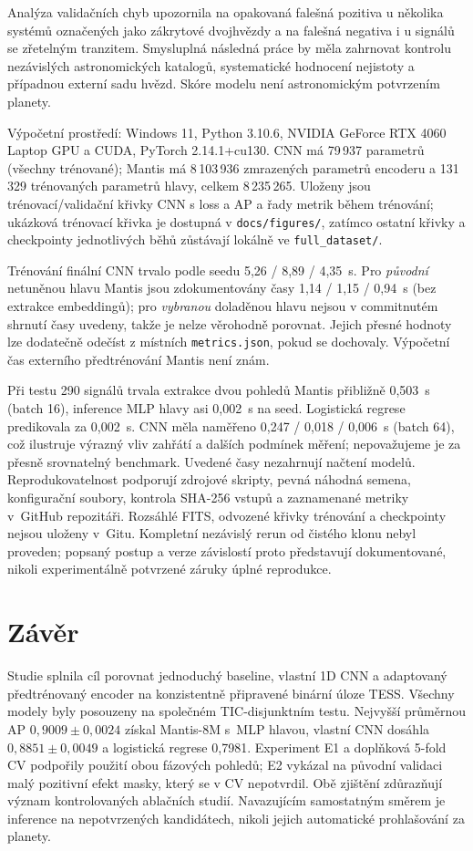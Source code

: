 \documentclass[11pt,a4paper]{article}
\newcommand{\code}[1]{\texttt{#1}}
\begin{document}
Analýza validačních chyb upozornila na opakovaná falešná pozitiva u několika systémů označených jako zákrytové dvojhvězdy a na falešná negativa i u signálů se zřetelným tranzitem. Smysluplná následná práce by měla zahrnovat kontrolu nezávislých astronomických katalogů, systematické hodnocení nejistoty a případnou externí sadu hvězd. Skóre modelu není astronomickým potvrzením planety.

Výpočetní prostředí: Windows 11, Python 3.10.6, NVIDIA GeForce RTX 4060 Laptop GPU a CUDA, PyTorch 2.14.1+cu130. CNN má 79\,937 parametrů (všechny trénované); Mantis má 8\,103\,936 zmrazených parametrů encoderu a 131\,329 trénovaných parametrů hlavy, celkem 8\,235\,265. Uloženy jsou trénovací/validační křivky CNN s loss a AP a řady metrik během trénování; ukázková trénovací křivka je dostupná v \code{docs/figures/}, zatímco ostatní křivky a checkpointy jednotlivých běhů zůstávají lokálně ve \code{full\_dataset/}.

Trénování finální CNN trvalo podle seedu 5,26 / 8,89 / 4,35~s. Pro \emph{původní} netuněnou hlavu Mantis jsou zdokumentovány časy 1,14 / 1,15 / 0,94~s (bez extrakce embeddingů); pro \emph{vybranou} doladěnou hlavu nejsou v commitnutém shrnutí časy uvedeny, takže je nelze věrohodně porovnat. Jejich přesné hodnoty lze dodatečně odečíst z místních \code{metrics.json}, pokud se dochovaly. Výpočetní čas externího předtrénování Mantis není znám.

Při testu 290 signálů trvala extrakce dvou pohledů Mantis přibližně 0,503~s (batch 16), inference MLP hlavy asi 0,002~s na seed. Logistická regrese predikovala za 0,002~s. CNN měla naměřeno 0,247 / 0,018 / 0,006~s (batch 64), což ilustruje výrazný vliv zahřátí a dalších podmínek měření; nepovažujeme je za přesně srovnatelný benchmark. Uvedené časy nezahrnují načtení modelů.
Reprodukovatelnost podporují zdrojové skripty, pevná náhodná semena, konfigurační soubory, kontrola SHA-256 vstupů a zaznamenané metriky v~GitHub repozitáři. Rozsáhlé FITS, odvozené křivky trénování a checkpointy nejsou uloženy v~Gitu. Kompletní nezávislý rerun od čistého klonu nebyl proveden; popsaný postup a verze závislostí proto představují dokumentované, nikoli experimentálně potvrzené záruky úplné reprodukce.

\section{Závěr}
Studie splnila cíl porovnat jednoduchý baseline, vlastní 1D CNN a adaptovaný předtrénovaný encoder na konzistentně připravené binární úloze TESS. Všechny modely byly posouzeny na společném TIC-disjunktním testu. Nejvyšší průměrnou AP $0{,}9009\pm0{,}0024$ získal Mantis-8M s~MLP hlavou, vlastní CNN dosáhla $0{,}8851\pm0{,}0049$ a logistická regrese 0,7981. Experiment E1 a doplňková 5-fold CV podpořily použití obou fázových pohledů; E2 vykázal na původní validaci malý pozitivní efekt masky, který se v CV nepotvrdil. Obě zjištění zdůrazňují význam kontrolovaných ablačních studií. Navazujícím samostatným směrem je inference na nepotvrzených kandidátech, nikoli jejich automatické prohlašování za planety.
\end{document}
